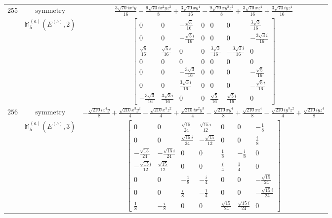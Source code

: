 \documentclass[fleqn,8pt,landscape]{jsarticle}
\begin{document}
\begin{longtable}{ccc}
$ 255 $ & $ \text{symmetry} $ & $ \frac{3 \sqrt{70} i x^{4} y}{16} - \frac{9 \sqrt{70} i x^{2} y z^{2}}{8} + \frac{3 \sqrt{70} x y^{4}}{16} - \frac{9 \sqrt{70} x y^{2} z^{2}}{8} + \frac{3 \sqrt{70} x z^{4}}{16} + \frac{3 \sqrt{70} i y z^{4}}{16} $ \\
$  $ & $ \mathbb{M}_{5}^{(a)}(E^{(b)},2) $ & $ \begin{bmatrix} 0 & 0 & - \frac{\sqrt{5}}{16} & 0 & 0 & 0 & \frac{3 \sqrt{3}}{16} \\ 0 & 0 & - \frac{\sqrt{5} i}{16} & 0 & 0 & 0 & - \frac{3 \sqrt{3} i}{16} \\ \frac{\sqrt{5}}{16} & \frac{\sqrt{5} i}{16} & 0 & 0 & \frac{3 \sqrt{3}}{16} & - \frac{3 \sqrt{3} i}{16} & 0 \\ 0 & 0 & 0 & 0 & 0 & 0 & 0 \\ 0 & 0 & - \frac{3 \sqrt{3}}{16} & 0 & 0 & 0 & - \frac{\sqrt{5}}{16} \\ 0 & 0 & \frac{3 \sqrt{3} i}{16} & 0 & 0 & 0 & - \frac{\sqrt{5} i}{16} \\ - \frac{3 \sqrt{3}}{16} & \frac{3 \sqrt{3} i}{16} & 0 & 0 & \frac{\sqrt{5}}{16} & \frac{\sqrt{5} i}{16} & 0 \end{bmatrix} $ \\ \hline
$ 256 $ & $ \text{symmetry} $ & $ - \frac{\sqrt{210} i x^{4} y}{8} + \frac{\sqrt{210} x^{3} y^{2}}{4} - \frac{\sqrt{210} x^{3} z^{2}}{4} + \frac{\sqrt{210} i x^{2} y^{3}}{4} - \frac{\sqrt{210} x y^{4}}{8} + \frac{\sqrt{210} x z^{4}}{8} - \frac{\sqrt{210} i y^{3} z^{2}}{4} + \frac{\sqrt{210} i y z^{4}}{8} $ \\
$  $ & $ \mathbb{M}_{5}^{(a)}(E^{(b)},3) $ & $ \begin{bmatrix} 0 & 0 & \frac{\sqrt{15}}{24} & \frac{\sqrt{15} i}{12} & 0 & 0 & - \frac{1}{8} \\ 0 & 0 & \frac{\sqrt{15} i}{24} & - \frac{\sqrt{15}}{12} & 0 & 0 & \frac{i}{8} \\ - \frac{\sqrt{15}}{24} & - \frac{\sqrt{15} i}{24} & 0 & 0 & \frac{1}{8} & - \frac{i}{8} & 0 \\ - \frac{\sqrt{15} i}{12} & \frac{\sqrt{15}}{12} & 0 & 0 & \frac{i}{4} & \frac{1}{4} & 0 \\ 0 & 0 & - \frac{1}{8} & - \frac{i}{4} & 0 & 0 & - \frac{\sqrt{15}}{24} \\ 0 & 0 & \frac{i}{8} & - \frac{1}{4} & 0 & 0 & - \frac{\sqrt{15} i}{24} \\ \frac{1}{8} & - \frac{i}{8} & 0 & 0 & \frac{\sqrt{15}}{24} & \frac{\sqrt{15} i}{24} & 0 \end{bmatrix} $ \\ \hline
\end{longtable}
\end{document}
